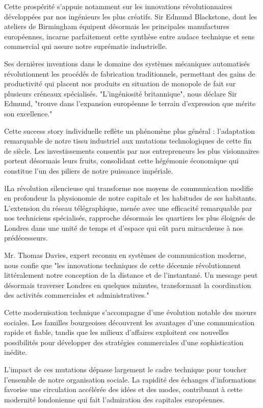 \documentclass{news}
\begin{document}
Cette prospérité s'appuie notamment sur les innovations révolutionnaires développées par nos ingénieurs les plus créatifs. Sir Edmund Blackstone, dont les ateliers de Birmingham équipent désormais les principales manufactures européennes, incarne parfaitement cette synthèse entre audace technique et sens commercial qui assure notre suprématie industrielle.

Ses dernières inventions dans le domaine des systèmes mécaniques automatisés révolutionnent les procédés de fabrication traditionnels, permettant des gains de productivité qui placent nos produits en situation de monopole de fait sur plusieurs créneaux spécialisés. "L'ingéniosité britannique", nous déclare Sir Edmund, "trouve dans l'expansion européenne le terrain d'expression que mérite son excellence."

Cette success story individuelle reflète un phénomène plus général : l'adaptation remarquable de notre tissu industriel aux mutations technologiques de cette fin de siècle. Les investissements consentis par nos entrepreneurs les plus visionnaires portent désormais leurs fruits, consolidant cette hégémonie économique qui constitue l'un des piliers de notre puissance impériale.

\l{L}a révolution silencieuse qui transforme nos moyens de communication modifie en profondeur la physionomie de notre capitale et les habitudes de ses habitants. L'extension du réseau télégraphique, menée avec une efficacité remarquable par nos techniciens spécialisés, rapproche désormais les quartiers les plus éloignés de Londres dans une unité de temps et d'espace qui eût paru miraculeuse à nos prédécesseurs.

Mr. Thomas Davies, expert reconnu en systèmes de communication moderne, nous confie que "les innovations techniques de cette décennie révolutionnent littéralement notre conception de la distance et de l'instantané. Un message peut désormais traverser Londres en quelques minutes, transformant la coordination des activités commerciales et administratives."

Cette modernisation technique s'accompagne d'une évolution notable des mœurs sociales. Les familles bourgeoises découvrent les avantages d'une communication rapide et fiable, tandis que les milieux d'affaires exploitent ces nouvelles possibilités pour développer des stratégies commerciales d'une sophistication inédite.

L'impact de ces mutations dépasse largement le cadre technique pour toucher l'ensemble de notre organisation sociale. La rapidité des échanges d'informations favorise une circulation accélérée des idées et des modes, contribuant à cette modernité londonienne qui fait l'admiration des capitales européennes.
\end{document}
